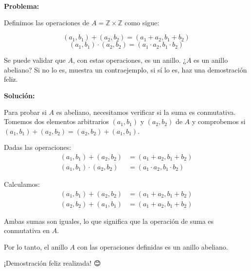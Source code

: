 \documentclass{article}
\begin{document}
\textbf{Problema:}

Definimos las operaciones de \( A = \mathbb{Z} \times \mathbb{Z} \) como sigue:

\[
(a_1, b_1) + (a_2, b_2) = (a_1 + a_2, b_1 + b_2)
\]
\[
(a_1, b_1) \cdot (a_2, b_2) = (a_1 \cdot a_2, b_1 \cdot b_2)
\]

Se puede validar que \( A \), con estas operaciones, es un anillo. ¿\( A \) es un anillo abeliano? Si no lo es, muestra un contraejemplo, si sí lo es, haz una demostración feliz.

\textbf{Solución:}

Para probar si \( A \) es abeliano, necesitamos verificar si la suma es conmutativa. Tomemos dos elementos arbitrarios \( (a_1, b_1) \) y \( (a_2, b_2) \) de \( A \) y comprobemos si \( (a_1, b_1) + (a_2, b_2) = (a_2, b_2) + (a_1, b_1) \).

Dadas las operaciones:
\begin{align*}
(a_1, b_1) + (a_2, b_2) &= (a_1 + a_2, b_1 + b_2) \\
(a_1, b_1) \cdot (a_2, b_2) &= (a_1 \cdot a_2, b_1 \cdot b_2)
\end{align*}

Calculamos:
\begin{align*}
(a_1, b_1) + (a_2, b_2) &= (a_1 + a_2, b_1 + b_2) \\
(a_2, b_2) + (a_1, b_1) &= (a_1 + a_2, b_1 + b_2)
\end{align*}

Ambas sumas son iguales, lo que significa que la operación de suma es conmutativa en \( A \).

Por lo tanto, el anillo \( A \) con las operaciones definidas es un anillo abeliano.

¡Demostración feliz realizada! 😊
\end{document}
